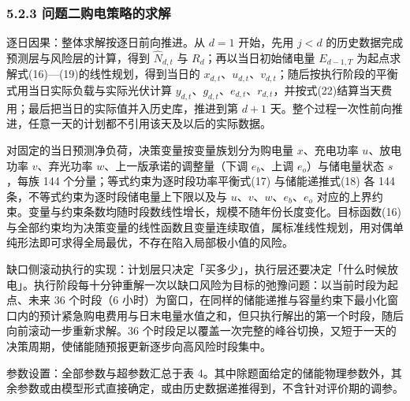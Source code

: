 \documentclass[12pt,a4paper]{ctexart}
\begin{document}
\subsubsection*{5.2.3 问题二购电策略的求解}

逐日因果：整体求解按逐日前向推进。从 $d=1$ 开始，先用 $j<d$ 的历史数据完成预测层与风险层的计算，得到 $\widehat{N}_{d,t}$ 与 $R_d$；再以当日初始储电量 $E_{d-1,T}$ 为起点求解式(16)—(19)的线性规划，得到当日的 $x_{d,t}$、$u_{d,t}$、$v_{d,t}$；随后按执行阶段的平衡式用当日实际负载与实际光伏计算 $y_{d,t}$、$g_{d,t}$、$e_{d,t}$、$r_{d,t}$，并按式(22)结算当天费用；最后把当日的实际值并入历史库，推进到第 $d+1$ 天。整个过程一次性前向推进，任意一天的计划都不引用该天及以后的实际数据。

对固定的当日预测净负荷，决策变量按变量族划分为购电量 $x$、充电功率 $u$、放电功率 $v$、弃光功率 $w$、上一版承诺的调整量（下调 $e_b$、上调 $e_o$）与储电量状态 $s$，每族 144 个分量；等式约束为逐时段功率平衡式(17) 与储能递推式(18) 各 144 条，不等式约束为逐时段储电量上下限以及与 $u$、$v$、$w$、$e_b$、$e_o$ 对应的上界约束。变量与约束条数均随时段数线性增长，规模不随年份长度变化。目标函数(16) 与全部约束均为决策变量的线性函数且变量连续取值，属标准线性规划，用对偶单纯形法即可求得全局最优，不存在陷入局部极小值的风险。

缺口侧滚动执行的实现：计划层只决定「买多少」，执行层还要决定「什么时候放电」。执行阶段每十分钟重解一次以缺口风险为目标的弛豫问题：以当前时段为起点、未来 36 个时段（6 小时）为窗口，在同样的储能递推与容量约束下最小化窗口内的预计紧急购电费用与日末电量水值之和，但只执行解出的第一个时段，随后向前滚动一步重新求解。36 个时段足以覆盖一次完整的峰谷切换，又短于一天的决策周期，使储能随预报更新逐步向高风险时段集中。

参数设置：全部参数与超参数汇总于表 4。其中除题面给定的储能物理参数外，其余参数或由模型形式直接确定，或由历史数据递推得到，不含针对评价期的调参。
\end{document}
